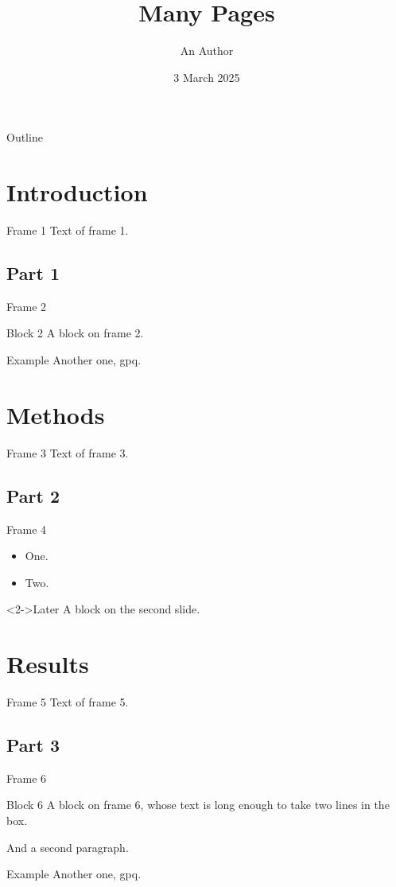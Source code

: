 \documentclass{beamer}
\title{Many Pages}
\author{An Author}
\date{3 March 2025}
\begin{document}
\begin{frame}
\titlepage
\end{frame}
\begin{frame}{Outline}
\tableofcontents
\end{frame}
\section{Introduction}
\begin{frame}{Frame 1}
Text of frame 1.
\end{frame}
\subsection{Part 1}
\begin{frame}{Frame 2}
\begin{block}{Block 2}
A block on frame 2.
\end{block}
\begin{exampleblock}{Example}
Another one, gpq.
\end{exampleblock}
\end{frame}
\section{Methods}
\begin{frame}{Frame 3}
Text of frame 3.
\end{frame}
\subsection{Part 2}
\begin{frame}{Frame 4}
\begin{itemize}
\item<1-> One.
\item<2-> Two.
\end{itemize}
\begin{block}<2->{Later}
A block on the second slide.
\end{block}
\end{frame}
\section{Results}
\begin{frame}{Frame 5}
Text of frame 5.
\end{frame}
\subsection{Part 3}
\begin{frame}{Frame 6}
\begin{block}{Block 6}
A block on frame 6, whose text is long enough to take two lines in the box.

And a second paragraph.
\end{block}
\begin{exampleblock}{Example}
Another one, gpq.
\end{exampleblock}
\end{frame}
\end{document}

